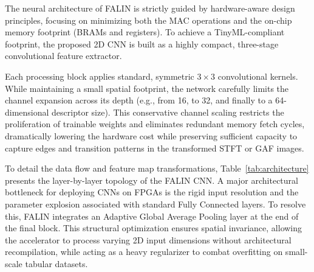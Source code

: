 \documentclass[10pt,conference]{IEEEtran}
\begin{document}
The neural architecture of FALIN is strictly guided by hardware-aware design principles, focusing on minimizing both the MAC operations and the on-chip memory footprint (BRAMs and registers). To achieve a TinyML-compliant footprint, the proposed 2D CNN is built as a highly compact, three-stage convolutional feature extractor. 

Each processing block applies standard, symmetric $3 \times 3$ convolutional kernels. While maintaining a small spatial footprint, the network carefully limits the channel expansion across its depth (e.g., from 16, to 32, and finally to a 64-dimensional descriptor size). This conservative channel scaling restricts the proliferation of trainable weights and eliminates redundant memory fetch cycles, dramatically lowering the hardware cost while preserving sufficient capacity to capture edges and transition patterns in the transformed STFT or GAF images.

To detail the data flow and feature map transformations, Table~\ref{tab:architecture} presents the layer-by-layer topology of the FALIN CNN. A major architectural bottleneck for deploying CNNs on FPGAs is the rigid input resolution and the parameter explosion associated with standard Fully Connected layers. To resolve this, FALIN integrates an Adaptive Global Average Pooling layer at the end of the final block. This structural optimization ensures spatial invariance, allowing the accelerator to process varying 2D input dimensions without architectural recompilation, while acting as a heavy regularizer to combat overfitting on small-scale tabular datasets.


\begin{table}[htbp]
    \centering
    \caption{FALIN Hardware-Aware Convolutional Architecture}
    \label{tab:architecture}
\end{table}
\end{document}
